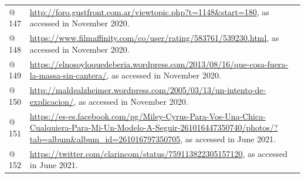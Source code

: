 \documentclass[10pt]{article}
\begin{document}
\begin{flushleft}
\begin{supertabular}{m{0.7955598in}m{5.35876in}}
@ 147  &
\url{http://foro.gustfront.com.ar/viewtopic.php?t=1148&start=180}, as accessed in November 2020.\\
@ 148  &
\url{https://www.filmaffinity.com/co/user/rating/583761/539230.html}, as accessed in November 2020.\\
@ 149  &
\url{https://elnosoyloquedeberia.wordpress.com/2013/08/16/que-cosa-fuera-la-massa-sin-cantera/}, as accessed in November 2020.\\
@ 150  &
\url{http://maldealzheimer.wordpress.com/2005/03/13/un-intento-de-explicacion/}, as accessed in November 2020.\\
@ 151 &
\url{https://es-es.facebook.com/pg/Miley-Cyrus-Para-Vos-Una-Chica-Cualquiera-Para-Mi-Un-Modelo-A-Seguir-261016447350740/photos/?tab=album&album_id=261016797350705}, as accessed in June 2021.\\
@ 152 &
\url{https://twitter.com/clarincom/status/759113822305157120}, as accessed in June 2021.\\
\end{supertabular}
\end{flushleft}
\end{document}
